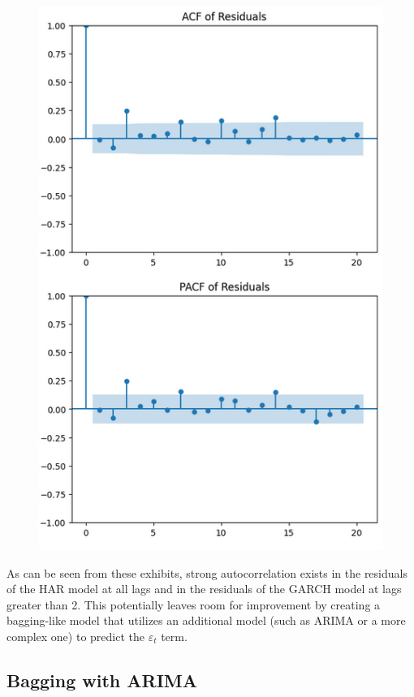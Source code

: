 \begin{figure}[]
\begin{minipage}{.5\textwidth}
  \centering
  \includegraphics[width=.9\linewidth]{img/garch_acf+pacf.png}
  \label{fig:garch_acf+pacf}
\end{minipage}
\end{figure}

As can be seen from these exhibits, strong autocorrelation exists in the residuals of the HAR model at all lags and in the residuals of the GARCH model at lags greater than 2. This potentially leaves room for improvement by creating a bagging-like model that utilizes an additional model (such as ARIMA or a more complex one) to predict the \(\varepsilon_t\) term.

\subsection{Bagging with ARIMA}

